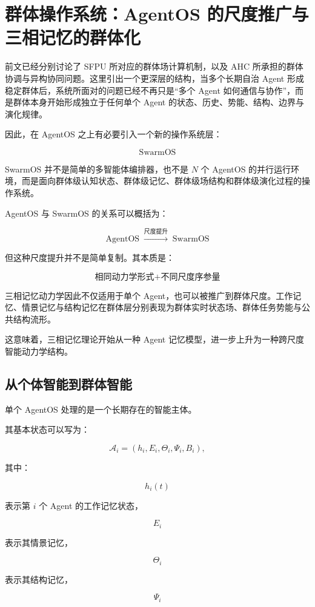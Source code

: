 \chapter{群体操作系统：AgentOS 的尺度推广与三相记忆的群体化}

前文已经分别讨论了 SFPU 所对应的群体场计算机制，以及 AHC 所承担的群体协调与异构协同问题。这里引出一个更深层的结构，当多个长期自治 Agent 形成稳定群体后，系统所面对的问题已经不再只是``多个 Agent 如何通信与协作''，而是群体本身开始形成独立于任何单个 Agent 的状态、历史、势能、结构、边界与演化规律。

因此，在 AgentOS 之上有必要引入一个新的操作系统层：

\[
\boxed{\mathrm{SwarmOS}}
\]

SwarmOS 并不是简单的多智能体编排器，也不是 $N$ 个 AgentOS 的并行运行环境，而是面向群体级认知状态、群体级记忆、群体级场结构和群体级演化过程的操作系统。

AgentOS 与 SwarmOS 的关系可以概括为：

\[
\boxed{
\mathrm{AgentOS}
\;\xrightarrow{\text{尺度提升}}\;
\mathrm{SwarmOS}
}
\]

但这种尺度提升并不是简单复制。其本质是：

\[
\boxed{
\text{相同动力学形式}
+
\text{不同尺度序参量}
}
\]

三相记忆动力学因此不仅适用于单个 Agent，也可以被推广到群体尺度。工作记忆、情景记忆与结构记忆在群体层分别表现为群体实时状态场、群体任务势能与公共结构流形。

这意味着，三相记忆理论开始从一种 Agent 记忆模型，进一步上升为一种跨尺度智能动力学结构。


\section{从个体智能到群体智能}

单个 AgentOS 处理的是一个长期存在的智能主体。

其基本状态可以写为：

\[
\mathcal{A}_i
=
\left(
h_i,
E_i,
\Theta_i,
\Psi_i,
B_i
\right),
\]

其中：

\[
h_i(t)
\]

表示第 $i$ 个 Agent 的工作记忆状态，

\[
E_i
\]

表示其情景记忆，

\[
\Theta_i
\]

表示其结构记忆，

\[
\Psi_i
\]

